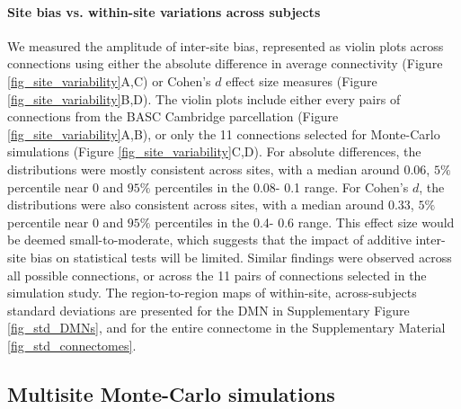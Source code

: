 \documentclass[authoryear]{elsarticle}
\begin{document}
\paragraph{Site bias vs. within-site variations across subjects} We measured the amplitude of inter-site bias, represented as violin plots across connections using either the absolute difference in average connectivity (Figure \ref{fig_site_variability}A,C) or Cohen's $d$ effect size measures (Figure \ref{fig_site_variability}B,D). The violin plots include either every pairs of
connections from the BASC Cambridge parcellation (Figure \ref{fig_site_variability}A,B), or only the 11 connections selected for Monte-Carlo
simulations (Figure \ref{fig_site_variability}C,D). For absolute differences, the distributions were mostly consistent across sites, with a
median around 0.06, $5\%$ percentile near 0 and $95\%$ percentiles in the 0.08-
0.1 range. For Cohen's $d$, the distributions were also consistent across sites, with a
median around 0.33, $5\%$ percentile near 0 and $95\%$ percentiles in the 0.4-
0.6 range. This effect size would be deemed small-to-moderate, which suggests that the impact of additive inter-site bias on
statistical tests will be limited. Similar findings were observed across all possible connections, or across the 11 pairs of
connections selected in the simulation study. The region-to-region maps of within-site, across-subjects standard
deviations are presented for the DMN in Supplementary Figure \ref{fig_std_DMNs},
and for the entire connectome in the Supplementary Material
\ref{fig_std_connectomes}. 

\subsection{Multisite Monte-Carlo simulations}
\end{document}
